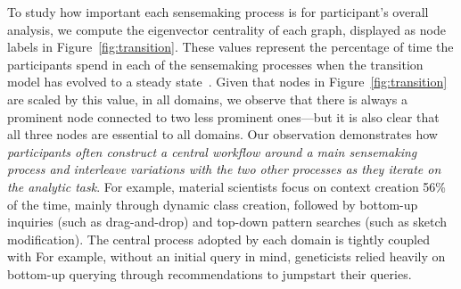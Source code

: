 \par To study how important each sensemaking process
is for participant's overall analysis,
we compute the eigenvector centrality of each graph,
displayed as node labels in Figure~\ref{fig:transition}.
These values represent the percentage of time the participants
spend in each of the sensemaking processes
when the transition model has evolved to a steady state~\cite{pierre2011}.
Given that nodes in Figure~\ref{fig:transition}
are scaled by this value, in all domains,
we observe that there is always a prominent node
connected to two less prominent ones---but it is also clear
that all three nodes are essential to all domains.
Our observation demonstrates how \emph{participants
often construct a central workflow
around a main sensemaking process
and interleave variations with the two other processes
as they iterate on the analytic task}. For example, material scientists focus
on context creation 56\% of the time,
mainly through dynamic class creation,
followed by bottom-up inquiries (such as drag-and-drop)
 and top-down pattern searches (such as sketch modification).
The central process adopted by each domain
is tightly coupled with  For example, without an initial query in mind,
geneticists relied heavily on bottom-up querying
through recommendations to jumpstart their queries.
